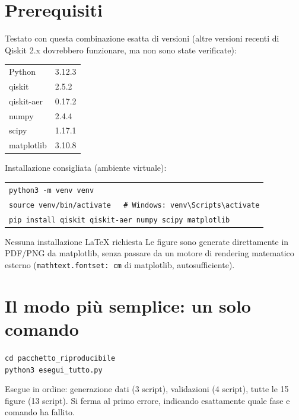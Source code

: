 \documentclass[11pt,a4paper]{article}
\newcommand{\code}[1]{\texttt{\small #1}}
\begin{document}
\section{Prerequisiti}

Testato con questa combinazione esatta di versioni (altre versioni
recenti di Qiskit 2.x dovrebbero funzionare, ma non sono state
verificate):

\begin{keyeq}
\centering
\begin{tabular}{@{}ll@{}}
Python & 3.12.3\\
qiskit & 2.5.2\\
qiskit-aer & 0.17.2\\
numpy & 2.4.4\\
scipy & 1.17.1\\
matplotlib & 3.10.8\\
\end{tabular}
\end{keyeq}

Installazione consigliata (ambiente virtuale):
\begin{keyeq}
\centering
\begin{tabular}{@{}l@{}}
\code{python3 -m venv venv}\\
\code{source venv/bin/activate\ \ \ \# Windows: venv\textbackslash Scripts\textbackslash activate}\\
\code{pip install qiskit qiskit-aer numpy scipy matplotlib}\\
\end{tabular}
\end{keyeq}

\begin{okbox}{Nessuna installazione LaTeX richiesta}
Le figure sono generate direttamente in PDF/PNG da matplotlib, senza
passare da un motore di rendering matematico esterno
(\code{mathtext.fontset: cm} di matplotlib, autosufficiente).
\end{okbox}

\section{Il modo più semplice: un solo comando}

\begin{keyeq}
\centering
\code{cd pacchetto\_riproducibile}\\
\code{python3 esegui\_tutto.py}
\end{keyeq}

Esegue in ordine: generazione dati (3 script), validazioni (4 script),
tutte le 15 figure (13 script). Si ferma al primo errore, indicando
esattamente quale fase e comando ha fallito.
\end{document}
